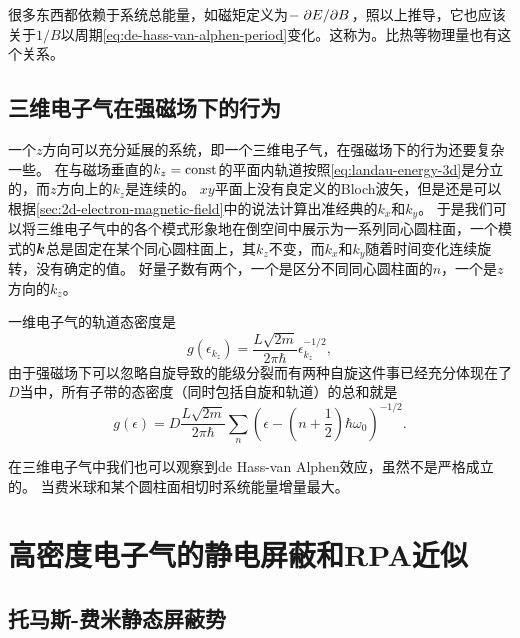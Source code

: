 很多东西都依赖于系统总能量，如磁矩定义为$- \pdv*{E}{B}$，照以上推导，它也应该关于$1/B$以周期\eqref{eq:de-hass-van-alphen-period}变化。这称为。比热等物理量也有这个关系。

\subsection{三维电子气在强磁场下的行为}

一个$z$方向可以充分延展的系统，即一个三维电子气，在强磁场下的行为还要复杂一些。
在与磁场垂直的$k_z=\mathrm{const}$的平面内轨道按照\eqref{eq:landau-energy-3d}是分立的，而$z$方向上的$k_z$是连续的。
$xy$平面上没有良定义的Bloch波矢，但是还是可以根据\autoref{sec:2d-electron-magnetic-field}中的说法计算出准经典的$k_x$和$k_y$。
于是我们可以将三维电子气中的各个模式形象地在倒空间中展示为一系列同心圆柱面，一个模式的$\vb*{k}$总是固定在某个同心圆柱面上，其$k_z$不变，而$k_x$和$k_y$随着时间变化连续旋转，没有确定的值。
好量子数有两个，一个是区分不同同心圆柱面的$n$，一个是$z$方向的$k_z$。

一维电子气的轨道态密度是
\begin{equation}
    g(\epsilon_{k_z}) = \frac{L \sqrt{2m}}{2 \pi \hbar} \epsilon_{k_z}^{-1/2},
\end{equation}
由于强磁场下可以忽略自旋导致的能级分裂而有两种自旋这件事已经充分体现在了$D$当中，所有子带的态密度（同时包括自旋和轨道）的总和就是
\begin{equation}
    g(\epsilon) = D \frac{L \sqrt{2m}}{2 \pi \hbar} \sum_n \left(\epsilon - \left( n + \frac{1}{2} \right) \hbar \omega_0 \right)^{-1/2}.
\end{equation}

在三维电子气中我们也可以观察到de Hass-van Alphen效应，虽然不是严格成立的。
当费米球和某个圆柱面相切时系统能量增量最大。

\section{高密度电子气的静电屏蔽和RPA近似}

\subsection{托马斯-费米静态屏蔽势}\label{sec:ext-e}

